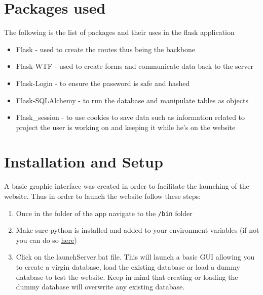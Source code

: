 \documentclass{article}
\begin{document}

\section{Packages used}
\label{packages used}
The following is the list of packages and their uses in the flask application

\begin{itemize}
    \item Flask - used to create the routes thus being the backbone
    \item Flask-WTF - used to create forms and communicate data back to the server
    \item Flask-Login - to ensure the password is safe and hashed
    \item Flask-SQLAlchemy - to run the database and manipulate tables as objects
    \item Flask\_session - to use cookies to save data such as information related to project the user is working on and keeping it while he's on the website 
\end{itemize}

\newpage

\section{Installation and Setup}

A basic graphic interface was created in order to facilitate the launching of the website. Thus in order to launch the website follow these steps:

\begin{enumerate}
    \item Once in the folder of the app navigate to the \verb|/bin| folder 
    \item Make sure python is installed and added to your environment variables (if not you can do so \hyperlink{https://www.python.org/downloads/}{here})
    \item Click on the launchServer.bat file. This will launch a basic GUI allowing you to create a virgin database, load the existing database or load a dummy database to test the website.
    Keep in mind that creating or loading the dummy database will overwrite any existing database.
\end{enumerate}
\end{document}

